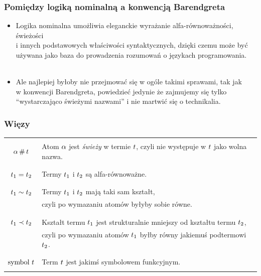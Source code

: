 \documentclass[aspectratio=169]{beamer}
\renewcommand{\it}[1]{\textit{#1}}
\begin{document}
\begin{frame}
\frametitle{Pomiędzy logiką nominalną a konwencją Barendgreta}
\begin{itemize}
  \item Logika nominalna umożliwia eleganckie wyrażanie alfa-równoważności, świeżości \\
        i innych podstawowych właściwości syntaktycznych, dzięki czemu może być \\
        używana jako baza do prowadzenia rozumowań o językach programowania.
  \\
  \\
  \item Ale najlepiej byłoby nie przejmować się w ogóle takimi sprawami, tak jak \\
        w konwencji Barendgreta, powiedzieć jedynie że zajmujemy się tylko \\
        “wystarczająco świeżymi nazwami” i nie martwić się o technikalia.
  \end{itemize}
\end{frame}

\begin{frame}
\frametitle{Więzy}
  \begin{tabularx}{\linewidth}{|c|X|}
    \hline & \\
    $\alpha \,\#\, t$ & Atom $\alpha$ jest \it{świeży} w termie $t$,
      czyli nie występuje w  $t$ jako wolna nazwa. \\ & \\
    \hline & \\
    $t_1 = t_2$ & Termy $t_1$ i $t_2$ są alfa-równoważne. \\ & \\
    \hline & \\
    $t_1 \sim t_2$ & Termy $t_1$ i $t_2$ mają taki sam kształt,
    \\ & czyli po wymazaniu atomów byłyby sobie równe. \\ & \\
    \hline & \\
    $t_1 \prec t_2$ & Kształt termu $t_1$ jest strukturalnie mniejszy od kształtu termu $t_2$,
    \\ & czyli po wymazaniu atomów $t_1$ byłby równy jakiemuś podtermowi $t_2$.
    \\ & \\
    \hline & \\
    $\text{symbol } t$ & Term $t$ jest jakimś symbolowem funkcyjnym. \\ & \\
    \hline
  \end{tabularx}
\end{frame}
\end{document}
